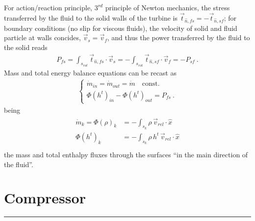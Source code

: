 \documentclass[letterpaper,10pt,english]{jupyterBook}
\begin{document}
\sphinxAtStartPar
For action/reaction principle, \(3^{rd}\) principle of Newton mechanics, the stress transferred by the fluid to the solid walls of the turbine is \(\vec{t}_{\hat{n},fs} = -\vec{t}_{\hat{n},sf}\); for boundary conditions (no slip for viscous fluids), the velocity of solid and fluid particle at walls concides, \(\vec{v}_s = \vec{v}_f\), and thus the power transferred by the fluid to the solid reads
\begin{equation*}
\begin{split}P_{fs} = \int_{s_{rot}} \vec{t}_{\hat{n},fs} \cdot \vec{v}_s = - \int_{s_{rot}} \vec{t}_{\hat{n},sf} \cdot \vec{v}_f = - P_{sf} \ .\end{split}
\end{equation*}
\sphinxAtStartPar
Mass and total energy balance equations can be recast as
\begin{equation*}
\begin{split}\begin{cases}
  \dot{m}_{in} = \dot{m}_{out} = \dot{m} \quad \text{const.} \\
  \Phi(h^t)_{in} - \Phi(h^t)_{out} = P_{fs} \ .
\end{cases}\end{split}
\end{equation*}
\sphinxAtStartPar
being
\begin{equation*}
\begin{split}\begin{aligned}
 \dot{m}_k = \Phi(\rho)_k  & = - \int_{s_k} \rho \, \vec{v}_{rel} \cdot \hat{x} \\
             \Phi(h^t)_k   & = - \int_{s_k} \rho \, h^t \, \vec{v}_{rel} \cdot \hat{x} \\
\end{aligned}\end{split}
\end{equation*}
\sphinxAtStartPar
the mass and total enthalpy fluxes through the surfaces “in the main direction of the fluid”.


\section{Compressor}
\label{\detokenize{ch/thermodynamic-transformations:compressor}}\label{\detokenize{ch/thermodynamic-transformations:classical-thermodynamics-transformations-compressor}}

\bigskip\hrule\bigskip


\sphinxstepscope
\end{document}
